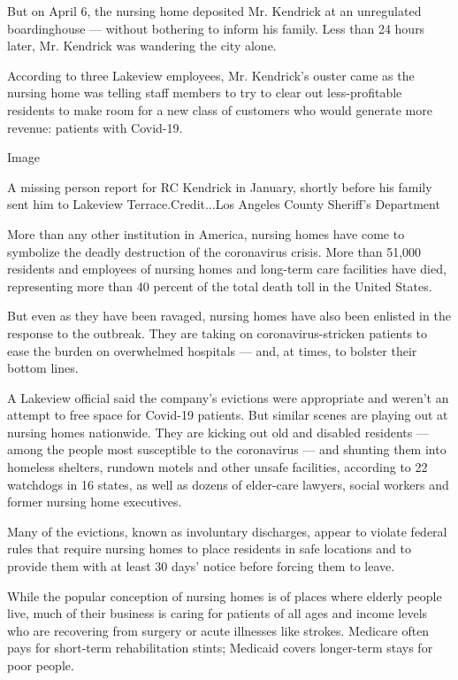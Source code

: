 But on April 6, the nursing home deposited Mr. Kendrick at an
unregulated boardinghouse --- without bothering to inform his family.
Less than 24 hours later, Mr. Kendrick was wandering the city alone.

According to three Lakeview employees, Mr. Kendrick's ouster came as the
nursing home was telling staff members to try to clear out
less-profitable residents to make room for a new class of customers who
would generate more revenue: patients with Covid-19.

Image

A missing person report for RC Kendrick in January, shortly before his
family sent him to Lakeview Terrace.Credit...Los Angeles County
Sheriff's Department

More than any other institution in America, nursing homes have come to
symbolize the deadly destruction of the coronavirus crisis. More than
51,000 residents and employees of nursing homes and long-term care
facilities have died, representing more than 40 percent of the total
death toll in the United States.

But even as they have been ravaged, nursing homes have also been
enlisted in the response to the outbreak. They are taking on
coronavirus-stricken patients to ease the burden on overwhelmed
hospitals --- and, at times, to bolster their bottom lines.

A Lakeview official said the company's evictions were appropriate and
weren't an attempt to free space for Covid-19 patients. But similar
scenes are playing out at nursing homes nationwide. They are kicking out
old and disabled residents --- among the people most susceptible to the
coronavirus --- and shunting them into homeless shelters, rundown motels
and other unsafe facilities, according to 22 watchdogs in 16 states, as
well as dozens of elder-care lawyers, social workers and former nursing
home executives.

Many of the evictions, known as involuntary discharges, appear to
violate federal rules that require nursing homes to place residents in
safe locations and to provide them with at least 30 days' notice before
forcing them to leave.

While the popular conception of nursing homes is of places where elderly
people live, much of their business is caring for patients of all ages
and income levels who are recovering from surgery or acute illnesses
like strokes. Medicare often pays for short-term rehabilitation stints;
Medicaid covers longer-term stays for poor people.

